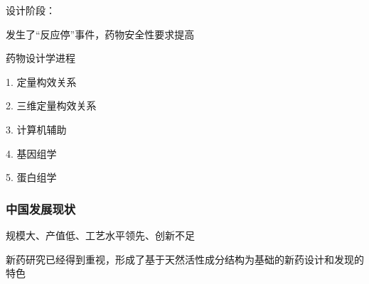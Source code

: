 \begin{notation}
    设计阶段：

    发生了“反应停”事件，药物安全性要求提高
\end{notation}
\begin{notation}
    药物设计学进程

    1. 定量构效关系

    2. 三维定量构效关系

    3. 计算机辅助

    4. 基因组学

    5. 蛋白组学
\end{notation}
\subsubsection{中国发展现状}%
\label{subsub:中国发展现状}
规模大、产值低、工艺水平领先、创新不足
\begin{notation}
    新药研究已经得到重视，形成了基于天然活性成分结构为基础的新药设计和发现的特色
\end{notation}
